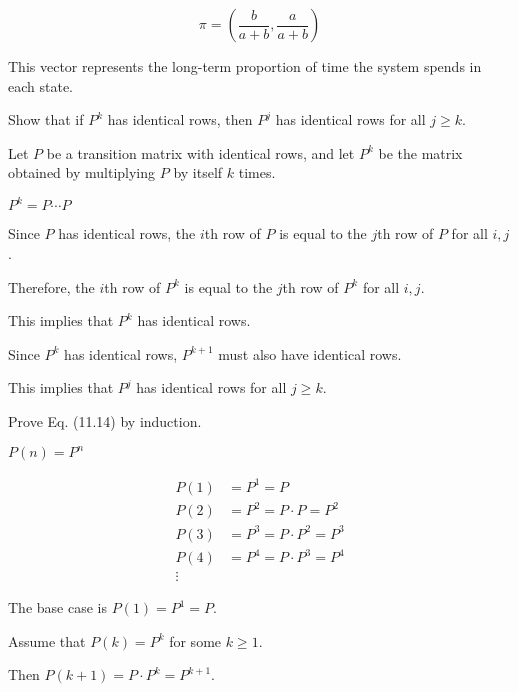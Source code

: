 \documentclass[answers]{exam}
\begin{document}
\begin{questions}
\begin{parts}
\begin{solution}
            \[ \pi = \left( \frac{b}{a + b}, \frac{a}{a + b} \right) \]

            This vector represents the long-term proportion of time the system spends in
            each state.

        \end{solution}
    \end{parts}


    Show that if $P^k$ has identical rows, then $P^j$ has identical rows for all $j
        \geq k$.
    \begin{solution}
        Let \(P\) be a transition matrix with identical rows, and let \(P^k\) be the matrix obtained by multiplying \(P\) by itself \(k\) times.

        \(P^k = P\cdots P\)

        Since \(P\) has identical rows, the \(i\)th row of \(P\) is equal to the
        \(j\)th row of \(P\) for all \(i, j\).

        Therefore, the \(i\)th row of \(P^k\) is equal to the \(j\)th row of \(P^k\)
        for all \(i, j\).

        This implies that \(P^k\) has identical rows.

        Since \(P^k\) has identical rows, \(P^{k+1}\) must also have identical rows.

        This implies that \(P^j\) has identical rows for all \(j \geq k\).
    \end{solution}


    Prove Eq. (11.14) by induction.

    \(P(n) = P^n\)
    \begin{solution}
        \begin{align*}
            P(1) & = P^1 = P                 \\
            P(2) & = P^2 = P \cdot P = P^2   \\
            P(3) & = P^3 = P \cdot P^2 = P^3 \\
            P(4) & = P^4 = P \cdot P^3 = P^4 \\
            \vdots
        \end{align*}

        The base case is \(P(1) = P^1 = P\).

        Assume that \(P(k) = P^k\) for some \(k \geq 1\).

        Then \(P(k+1) = P \cdot P^k = P^{k+1}\).


\end{solution}
\end{questions}
\end{document}
